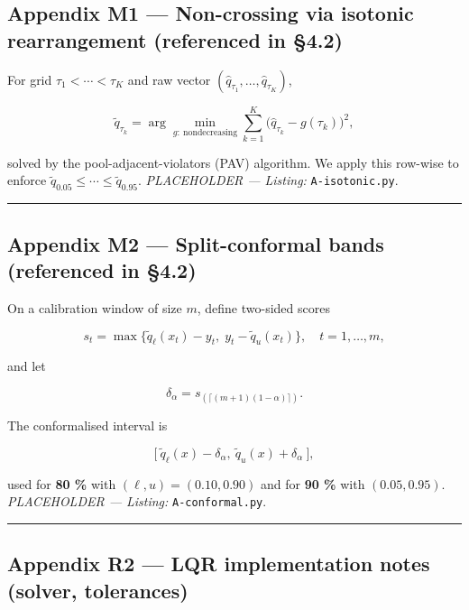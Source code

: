 \documentclass[
  a4paper,
  DIV=11,
  numbers=noendperiod]{scrreprt}
\begin{document}
\subsection{Appendix M1 --- Non-crossing via isotonic rearrangement
(referenced in §4.2)}\label{app-m1-isotonic}

For grid \(\tau_1<\cdots<\tau_K\) and raw vector
\((\widehat q_{\tau_1},\ldots,\widehat q_{\tau_K})\),

\[
\label{eq-isotonic-app}
\widetilde q_{\tau_k}
=\arg\min_{g:\ \text{nondecreasing}}
\sum_{k=1}^{K}\big(\widehat q_{\tau_k}-g(\tau_k)\big)^2,
\]

solved by the pool-adjacent-violators (PAV) algorithm. We apply this
row-wise to enforce
\(\widetilde q_{0.05}\le\cdots\le\widetilde q_{0.95}\).
\emph{PLACEHOLDER --- Listing:} \texttt{A-isotonic.py}.

\begin{center}\rule{0.5\linewidth}{0.5pt}\end{center}

\subsection{Appendix M2 --- Split-conformal bands (referenced in
§4.2)}\label{app-m2-conformal}

On a calibration window of size \(m\), define two-sided scores

\[
\label{eq-conformal-score-app}
s_t=\max\{\widetilde q_{\ell}(x_t)-y_t,\; y_t-\widetilde q_{u}(x_t)\},\quad t=1,\ldots,m,
\]

and let

\[
\label{eq-conformal-delta-app}
\delta_\alpha=s_{(\lceil (m+1)(1-\alpha)\rceil)}.
\]

The conformalised interval is

\[
\label{eq-conformal-band-app}
\big[\ \widetilde q_{\ell}(x)-\delta_\alpha,\ \widetilde q_{u}(x)+\delta_\alpha\ \big],
\]

used for \textbf{80 \%} with \((\ell,u)=(0.10,0.90)\) and for \textbf{90
\%} with \((0.05,0.95)\). \emph{PLACEHOLDER --- Listing:}
\texttt{A-conformal.py}.

\begin{center}\rule{0.5\linewidth}{0.5pt}\end{center}

\subsection{Appendix R2 --- LQR implementation notes (solver,
tolerances)}\label{app-r2-lqr-impl}
\end{document}
